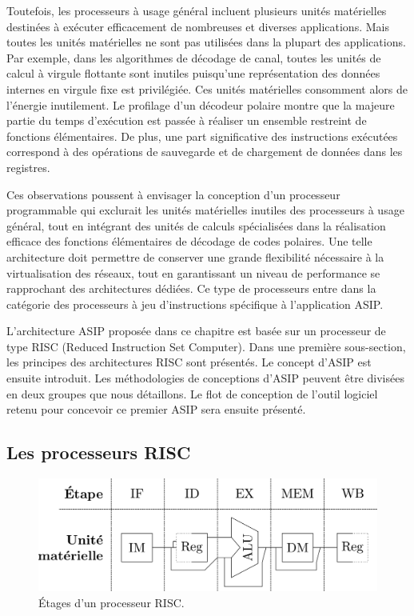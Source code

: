Toutefois, les processeurs à usage général incluent plusieurs unités matérielles destinées à exécuter efficacement de nombreuses et diverses applications. Mais toutes les unités matérielles ne sont pas utilisées dans la plupart des applications. Par exemple, dans les algorithmes de décodage de canal, toutes les unités de calcul à virgule flottante sont inutiles puisqu'une représentation des données internes en virgule fixe est privilégiée. Ces unités matérielles consomment alors de l'énergie inutilement. Le profilage d'un décodeur polaire montre que la majeure partie du temps d'exécution est passée à réaliser un ensemble restreint de fonctions élémentaires. De plus, une part significative des instructions exécutées correspond à des opérations de sauvegarde et de chargement de données dans les registres.

Ces observations poussent à envisager la conception d'un processeur programmable qui exclurait les unités matérielles inutiles des processeurs à usage général, tout en intégrant des unités de calculs spécialisées dans la réalisation efficace des fonctions élémentaires de décodage de codes polaires. Une telle architecture doit permettre de conserver une grande flexibilité nécessaire à la virtualisation des réseaux, tout en garantissant un niveau de performance se rapprochant des architectures dédiées. Ce type de processeurs entre dans la catégorie des processeurs à jeu d'instructions spécifique à l'application ASIP.

L'architecture ASIP proposée dans ce chapitre est basée sur un processeur de type RISC (Reduced Instruction Set Computer). Dans une première sous-section, les principes des architectures RISC sont présentés. Le concept d'ASIP est ensuite introduit. Les méthodologies de conceptions d'ASIP peuvent être divisées en deux groupes que nous détaillons. Le flot de conception de l'outil logiciel retenu pour concevoir ce premier ASIP sera ensuite présenté.

\subsection{Les processeurs RISC}
\label{subsec:risc}
\begin{figure}[t]
\centering
\includegraphics[width=\textwidth]{main/ch3_fig/stages}
\caption{\'Etages d'un processeur RISC.}
\label{fig:risc}
\end{figure}

